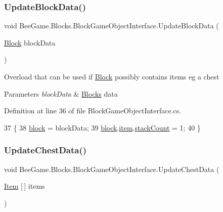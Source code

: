 \subsubsection{\texorpdfstring{Update\+Block\+Data()}{UpdateBlockData()}\hspace{0.1cm}{\footnotesize\ttfamily [2/2]}}
{\footnotesize\ttfamily void Bee\+Game.\+Blocks.\+Block\+Game\+Object\+Interface.\+Update\+Block\+Data (\begin{DoxyParamCaption}\item[{\hyperlink{class_bee_game_1_1_blocks_1_1_block}{Block}}]{block\+Data }\end{DoxyParamCaption})}



Overload that can be used if \hyperlink{class_bee_game_1_1_blocks_1_1_block}{Block} possibly contains items eg a chest 


\begin{DoxyParams}{Parameters}
{\em block\+Data} & \hyperlink{namespace_bee_game_1_1_blocks}{Blocks} data\\
\hline
\end{DoxyParams}


Definition at line 36 of file Block\+Game\+Object\+Interface.\+cs.


\begin{DoxyCode}
37         \{
38             \hyperlink{class_bee_game_1_1_blocks_1_1_block_game_object_interface_a238bad3b956ec84c8b1cc3127948b75d}{block} = blockData;
39             \hyperlink{class_bee_game_1_1_blocks_1_1_block_game_object_interface_a238bad3b956ec84c8b1cc3127948b75d}{block}.\hyperlink{class_bee_game_1_1_blocks_1_1_block_addc8d61c8acab21b0f15df5fed804f11}{item}.\hyperlink{struct_bee_game_1_1_items_1_1_item_aaa169917b0e0f8472f20398d5d448388}{stackCount} = 1;
40         \}
\end{DoxyCode}
\mbox{\label{class_bee_game_1_1_blocks_1_1_block_game_object_interface_a2e81344ecd9ed4dc9ce8b4a93b119ca2}} 
\subsubsection{\texorpdfstring{Update\+Chest\+Data()}{UpdateChestData()}}
{\footnotesize\ttfamily void Bee\+Game.\+Blocks.\+Block\+Game\+Object\+Interface.\+Update\+Chest\+Data (\begin{DoxyParamCaption}\item[{\hyperlink{struct_bee_game_1_1_items_1_1_item}{Item} \mbox{[}$\,$\mbox{]}}]{items }\end{DoxyParamCaption})}



